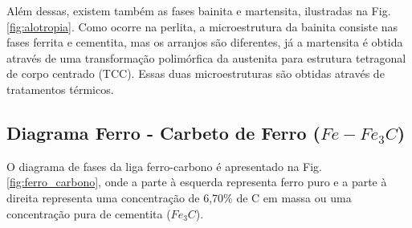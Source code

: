 \documentclass[
12pt,
openany, %
oneside, %
a4paper,			
english,			
brazil			        %
]{abntbibufjf}
\begin{document}
\begin{table}[H]
	\centering
	\caption{Propriedades mecânicas dos microconstituintes do aço. \cite{chiaverini2003tratamentos}}
	\label{tab:propriedades_aco}%

\end{table}%

	Além dessas, existem também as fases bainita e martensita, ilustradas na Fig. \ref{fig:alotropia}. Como ocorre na perlita, a microestrutura da bainita consiste nas fases ferrita e cementita, mas os arranjos são diferentes, já a martensita é obtida através de uma transformação polimórfica da austenita para estrutura tetragonal de corpo centrado (TCC). Essas duas microestruturas são obtidas através de tratamentos térmicos.	
	

\subsection{Diagrama Ferro - Carbeto de Ferro ($Fe-Fe_3C$)}

	O diagrama de fases da liga ferro-carbono é apresentado na Fig. \ref{fig:ferro_carbono}, onde a parte à esquerda representa ferro puro e a parte à direita representa uma concentração de 6,70\% de C em massa ou uma concentração pura de cementita ($Fe_3C$). 

	
	
\end{document}
